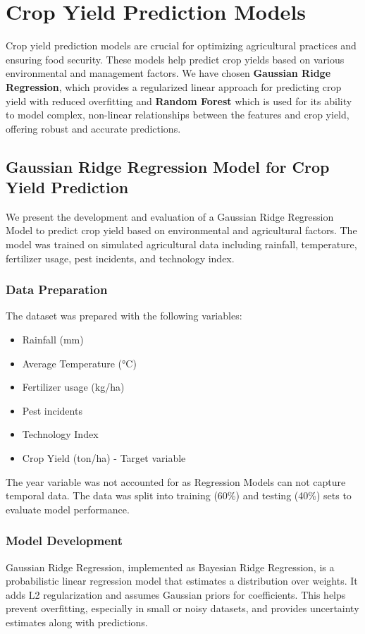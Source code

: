 \section{Crop Yield Prediction Models}

Crop yield prediction models are crucial for optimizing agricultural practices and ensuring food security. These models help predict crop yields based on various environmental and management factors. We have chosen \textbf{Gaussian Ridge Regression}, which provides a regularized linear approach for predicting crop yield with reduced overfitting and \textbf{Random Forest} which is used for its ability to model complex, non-linear relationships between the features and crop yield, offering robust and accurate predictions.

\subsection{Gaussian Ridge Regression Model for Crop Yield Prediction}

We present the development and evaluation of a Gaussian Ridge Regression Model to predict crop yield based on environmental and agricultural factors. The model was trained on simulated agricultural data including rainfall, temperature, fertilizer usage, pest incidents, and technology index.

\subsubsection{Data Preparation}
The dataset was prepared with the following variables:
\begin{itemize}
    \item Rainfall (mm)
    \item Average Temperature (°C)
    \item Fertilizer usage (kg/ha)
    \item Pest incidents
    \item Technology Index
    \item Crop Yield (ton/ha) - Target variable
\end{itemize}

The year variable was not accounted for as Regression Models can not capture temporal data. The data was split into training (60\%) and testing (40\%) sets to evaluate model performance.

\subsubsection{Model Development}
Gaussian Ridge Regression, implemented as Bayesian Ridge Regression, is a probabilistic linear regression model that estimates a distribution over weights. It adds L2 regularization and assumes Gaussian priors for coefficients. This helps prevent overfitting, especially in small or noisy datasets, and provides uncertainty estimates along with predictions.\\

